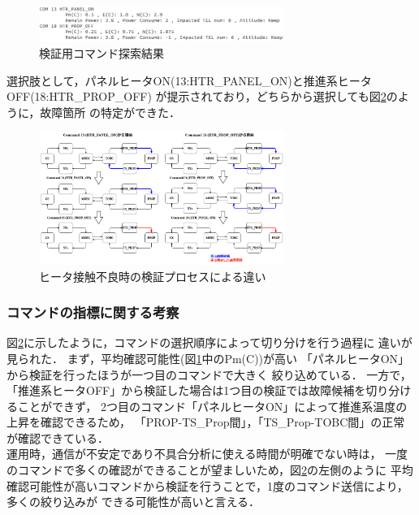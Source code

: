 \documentclass[11pt]{jsarticle}%
\begin{document}
\begin{multicols}{2}
 \begin{figure}[H]
   \centering
     \includegraphics[width=8.0cm]{../figure/COM_candidate.png}
     \caption{検証用コマンド探索結果}
     \label{fig:COM_candidate}%
 \end{figure}
選択肢として，パネルヒータON(13:HTR\_PANEL\_ON)と推進系ヒータOFF(18:HTR\_PROP\_OFF)
が提示されており，どちらから選択しても図\ref{fig:COM_process}のように，故障箇所
の特定ができた．
\begin{figure}[H]
  \centering
    \includegraphics[width=8.0cm]{../figure/COM_process_HTR_PROP_fault.png}
    \caption{ヒータ接触不良時の検証プロセスによる違い}
    \label{fig:COM_process}
\end{figure}
\subsubsection{コマンドの指標に関する考察}
図\ref{fig:COM_process}に示したように，コマンドの選択順序によって切り分けを行う過程に
違いが見られた．
まず，平均確認可能性(図\ref{fig:COM_candidate}中のPm(C))が高い
「パネルヒータON」から検証を行ったほうが一つ目のコマンドで大きく
絞り込めている．
一方で，「推進系ヒータOFF」から検証した場合は1つ目の検証では故障候補を切り分けることができず，
2つ目のコマンド「パネルヒータON」によって推進系温度の上昇を確認できるため，
「PROP-TS\_Prop間」，「TS\_Prop-TOBC間」の正常が確認できている．\\
運用時，通信が不安定であり不具合分析に使える時間が明確でない時は，
一度のコマンドで多くの確認ができることが望ましいため，図\ref{fig:COM_process}の左側のように
平均確認可能性が高いコマンドから検証を行うことで，1度のコマンド送信により，多くの絞り込みが
できる可能性が高いと言える．
\vspace{-1zh}

\end{multicols}
\end{document}
